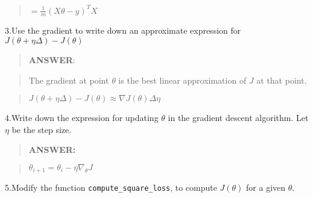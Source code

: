 \documentclass{article}
\begin{document}
\begin{quote}
\(=\frac{1}{m}(X\theta-y)^T X\)
\end{quote}

    3.Use the gradient to write down an approximate expression for
\(J(\theta+\eta\Delta)-J(\theta)\)

    \begin{quote}
\textbf{ANSWER}:
\end{quote}

\begin{quote}
The gradient at point \(\theta\) is the best linear approximation of
\(J\) at that point.
\end{quote}

\begin{quote}
\(J(\theta+\eta\Delta)-J(\theta) \approx \nabla J(\theta)\Delta\eta\)
\end{quote}

    4.Write down the expression for updating \(\theta\) in the gradient
descent algorithm. Let \(\eta\) be the step size.

    \begin{quote}
\textbf{ANSWER:}
\end{quote}

\begin{quote}
\(\theta_{i+1} = \theta_i-\eta\nabla_{\theta}J\)
\end{quote}

    5.Modify the function \texttt{compute\_square\_loss}, to compute
\(J(\theta)\) for a given \(\theta\).
\end{document}
